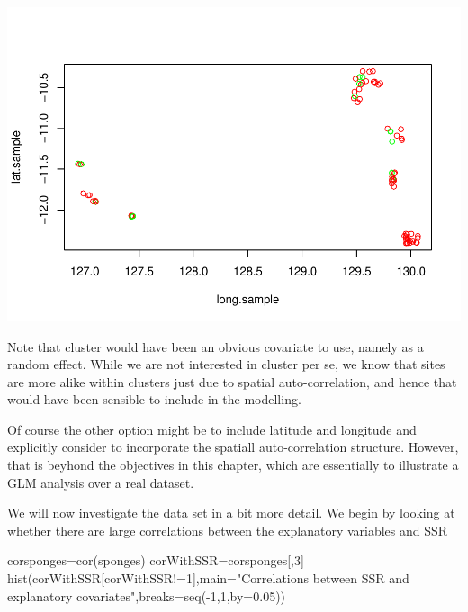 \documentclass[
]{book}
\newenvironment{Shaded}{\begin{snugshade}}{\end{snugshade}}
\newcommand{\AttributeTok}[1]{\textcolor[rgb]{0.77,0.63,0.00}{#1}}
\newcommand{\DecValTok}[1]{\textcolor[rgb]{0.00,0.00,0.81}{#1}}
\newcommand{\FloatTok}[1]{\textcolor[rgb]{0.00,0.00,0.81}{#1}}
\newcommand{\FunctionTok}[1]{\textcolor[rgb]{0.00,0.00,0.00}{#1}}
\newcommand{\NormalTok}[1]{#1}
\newcommand{\OtherTok}[1]{\textcolor[rgb]{0.56,0.35,0.01}{#1}}
\newcommand{\SpecialCharTok}[1]{\textcolor[rgb]{0.00,0.00,0.00}{#1}}
\newcommand{\StringTok}[1]{\textcolor[rgb]{0.31,0.60,0.02}{#1}}
\begin{document}
\includegraphics{ECOMODbook_files/figure-latex/unnamed-chunk-21-3.pdf}

Note that cluster would have been an obvious covariate to use, namely as a random effect. While we are not interested in cluster per se, we know that sites are more alike within clusters just due to spatial auto-correlation, and hence that would have been sensible to include in the modelling.

Of course the other option might be to include latitude and longitude and explicitly consider to incorporate the spatiall auto-correlation structure. However, that is beyhond the objectives in this chapter, which are essentially to illustrate a GLM analysis over a real dataset.

We will now investigate the data set in a bit more detail. We begin by looking at whether there are large correlations between the explanatory variables and SSR

\begin{Shaded}
\begin{Highlighting}[]
\NormalTok{corsponges}\OtherTok{=}\FunctionTok{cor}\NormalTok{(sponges)}
\NormalTok{corWithSSR}\OtherTok{=}\NormalTok{corsponges[,}\DecValTok{3}\NormalTok{]}
\FunctionTok{hist}\NormalTok{(corWithSSR[corWithSSR}\SpecialCharTok{!=}\DecValTok{1}\NormalTok{],}\AttributeTok{main=}\StringTok{"Correlations between SSR and explanatory covariates"}\NormalTok{,}\AttributeTok{breaks=}\FunctionTok{seq}\NormalTok{(}\SpecialCharTok{{-}}\DecValTok{1}\NormalTok{,}\DecValTok{1}\NormalTok{,}\AttributeTok{by=}\FloatTok{0.05}\NormalTok{))}
\end{Highlighting}
\end{Shaded}
\end{document}
